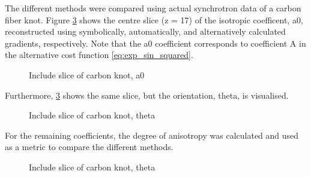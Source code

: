 The different methods were compared using actual synchrotron data of a carbon fiber knot.
Figure \ref{} shows the centre slice (z = 17) of the isotropic coefficent, a0, reconstructed using symbolically, automatically, and alternatively calculated gradients, respectively.
Note that the a0 coefficient corresponds to coefficient A in the alternative cost function \eqref{eq:exp_sin_squared}.
\begin{figure}[h!]
    \centering
    \caption{  Include slice of carbon knot, a0 }
    \label{}
\end{figure}
Furthermore, \ref{} shows the same slice, but the orientation, theta, is visualised.
\begin{figure}[h!]
    \centering
    \caption{  Include slice of carbon knot, theta }
    \label{}
\end{figure}

For the remaining coefficients, the degree of anisotropy was calculated and used as a metric to compare the different methods.

\begin{figure}[h!]
    \centering
    \caption{  Include slice of carbon knot, theta }
    \label{}
\end{figure}

